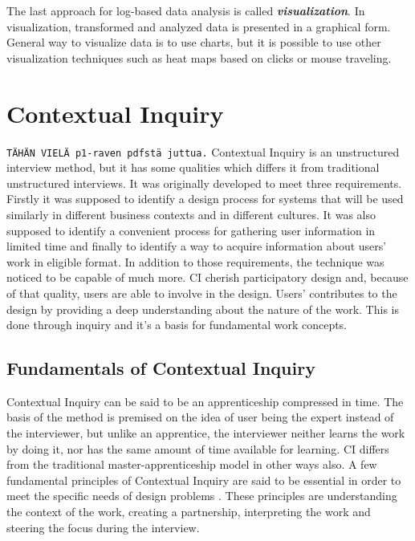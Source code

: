 \documentclass[12pt,a4paper,oneside,pdftex]{report}
\begin{document}
The last approach for log-based data analysis is called \textbf{\emph{visualization}}. In visualization, transformed and analyzed data is  presented in a graphical form. General way to visualize data is to use charts, but it is possible to use other visualization techniques such as heat maps based on clicks or mouse traveling. \cite{RefWorks:24, RefWorks:25}

\section{Contextual Inquiry}
\label{sec:cinquiry}
\texttt{TÄHÄN VIELÄ p1-raven pdfstä juttua.}
Contextual Inquiry is an unstructured interview method, but it has some qualities which differs it from traditional unstructured interviews.\cite{RefWorks:23}  It was originally developed to meet three requirements. Firstly it was supposed to identify a design process for systems that will be used similarly in different business contexts and in different cultures. It was also supposed to identify a convenient process for gathering user information in limited time and finally to identify a way to acquire information about users' work in eligible format. In addition to those requirements, the technique was noticed to be capable of much more. CI cherish participatory design and, because of that quality, users are able to involve in the design. Users' contributes to the design by providing a deep understanding about the nature of the work. This is done through inquiry and it's a basis for fundamental work concepts. \cite{RefWorks:14} 

\subsection{Fundamentals of Contextual Inquiry}
Contextual Inquiry can be said to be an apprenticeship compressed in time. The basis of the method is premised on the idea of user being the expert instead of the interviewer, but unlike an apprentice, the interviewer neither learns the work by doing it, nor has the same amount of time available for learning. \cite{RefWorks:21} CI differs from the traditional master-apprenticeship model in other ways also. A few fundamental principles of Contextual Inquiry are said to be essential in order to meet the specific needs of design problems \cite{RefWorks:21, RefWorks:22}.  These principles are understanding the context of the work, creating a partnership, interpreting the work and steering the focus during the interview. \cite{RefWorks:21}
\end{document}
